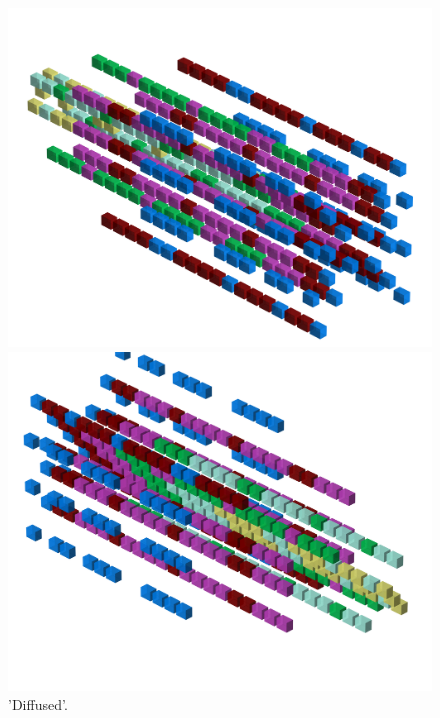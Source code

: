 \begin{minipage}[b]{0.48\linewidth}
\begin{figure}[H]
    \centering
    \begin{adjustbox}{width=6cm,margin=0cm 0cm}
      \includegraphics[width=12cm]{src/patterns/pattern5-45.png}%
    \end{adjustbox}
    \begin{adjustbox}{width=6cm,margin=0cm -1.8cm}
      \includegraphics[width=12cm]{src/patterns/pattern5-225.png}%
    \end{adjustbox}
\caption{'Diffused'.}
\end{figure}
\end{minipage}
